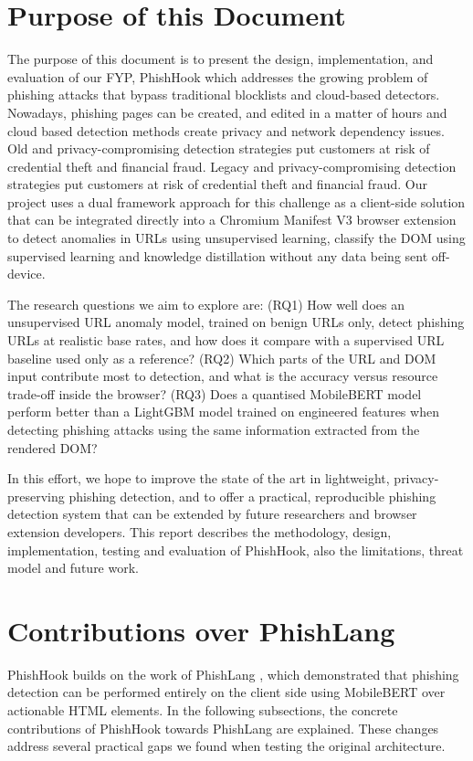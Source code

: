 \documentclass{FastFyp}
\begin{document}
\section{Purpose of this Document}
The purpose of this document is to present the design, implementation, and evaluation of our FYP, PhishHook which addresses the growing problem of phishing attacks that bypass traditional blocklists and cloud-based detectors. Nowadays, phishing pages can be created, and edited in a matter of hours and cloud based detection methods create privacy and network dependency issues. Old and privacy-compromising detection strategies put customers at risk of credential theft and financial fraud. Legacy and privacy-compromising detection strategies put customers at risk of credential theft and financial fraud. Our project uses a dual framework approach for this challenge as a client-side solution that can be integrated directly into a Chromium Manifest V3 browser extension to detect anomalies in URLs using unsupervised learning, classify the DOM using supervised learning and knowledge distillation without any data being sent off-device.

The research questions we aim to explore are: (RQ1) How well does an unsupervised URL anomaly model, trained on benign URLs only, detect phishing URLs at realistic base rates, and how does it compare with a supervised URL baseline used only as a reference? (RQ2) Which parts of the URL and DOM input contribute most to detection, and what is the accuracy versus resource trade-off inside the browser? (RQ3) Does a quantised MobileBERT model perform better than a LightGBM model trained on engineered features when detecting phishing attacks using the same information extracted from the rendered DOM?

In this effort, we hope to improve the state of the art in lightweight, privacy-preserving phishing detection, and to offer a practical, reproducible phishing detection system that can be extended by future researchers and browser extension developers. This report describes the methodology, design, implementation, testing and evaluation of PhishHook, also the limitations, threat model and future work.


\section{Contributions over PhishLang}
\label{sec:contributions}
PhishHook builds on the work of PhishLang \cite{phishlang2026}, which demonstrated that phishing detection can be performed entirely on the client side using MobileBERT over actionable HTML elements. In the following subsections, the concrete contributions of PhishHook towards PhishLang are explained. These changes address several practical gaps we found when testing the original architecture. 
\end{document}
